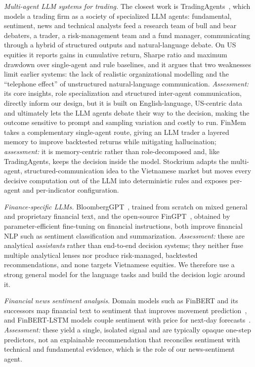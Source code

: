\documentclass[runningheads]{llncs}
\begin{document}
\emph{Multi-agent LLM systems for trading.} The closest work is
TradingAgents~\cite{tradingagents}, which models a trading firm as a society of
specialized LLM agents: fundamental, sentiment, news and technical analysts feed a
research team of bull and bear debaters, a trader, a risk-management team and a
fund manager, communicating through a hybrid of structured outputs and
natural-language debate. On US equities it reports gains in cumulative return,
Sharpe ratio and maximum drawdown over single-agent and rule baselines, and it
argues that two weaknesses limit earlier systems: the lack of realistic
organizational modelling and the ``telephone effect'' of unstructured
natural-language communication. \emph{Assessment:} its core insights, role
specialization and structured inter-agent communication, directly inform our
design, but it is built on English-language, US-centric data and ultimately lets
the LLM agents debate their way to the decision, making the outcome sensitive to
prompt and sampling variation and costly to run. FinMem~\cite{finmem} takes a
complementary single-agent route, giving an LLM trader a layered memory to improve
backtested returns while mitigating hallucination; \emph{assessment:} it is
memory-centric rather than role-decomposed and, like TradingAgents, keeps the
decision inside the model. Stockrium adapts the multi-agent, structured-communication
idea to the Vietnamese market but moves every decisive computation out of the LLM
into deterministic rules and exposes per-agent and per-indicator configuration.

\emph{Finance-specific LLMs.} BloombergGPT~\cite{bloomberggpt}, trained from
scratch on mixed general and proprietary financial text, and the open-source
FinGPT~\cite{fingpt}, obtained by parameter-efficient fine-tuning on financial
instructions, both improve financial NLP such as sentiment classification and
summarization. \emph{Assessment:} these are analytical \emph{assistants} rather
than end-to-end decision systems; they neither fuse multiple analytical lenses nor
produce risk-managed, backtested recommendations, and none targets Vietnamese
equities. We therefore use a strong general model for the language tasks and build
the decision logic around it.

\emph{Financial news sentiment analysis.} Domain models such as FinBERT and its
successors map financial text to sentiment that improves movement
prediction~\cite{finbert2023}, and FinBERT-LSTM models couple sentiment with price
for next-day forecasts~\cite{finbertlstm2022}. \emph{Assessment:} these yield a
single, isolated signal and are typically opaque one-step predictors, not an
explainable recommendation that reconciles sentiment with technical and
fundamental evidence, which is the role of our news-sentiment agent.
\end{document}
